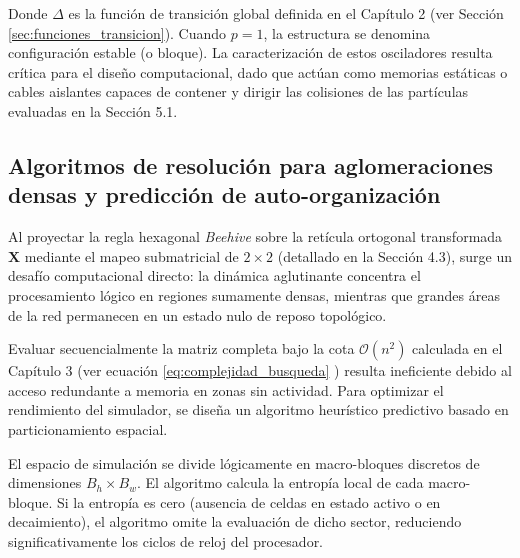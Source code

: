 Donde $\Delta$ es la función de transición global definida en el Capítulo 2 (ver Sección \ref{sec:funciones_transicion}). Cuando $p = 1$, la estructura se denomina configuración estable (o bloque). La caracterización de estos osciladores resulta crítica para el diseño computacional, dado que actúan como memorias estáticas o cables aislantes capaces de contener y dirigir las colisiones de las partículas evaluadas en la Sección 5.1.

\subsection{Algoritmos de resolución para aglomeraciones densas y predicción de auto-organización}
\label{subsec:algoritmo_beehive_particionado}

Al proyectar la regla hexagonal \textit{Beehive} sobre la retícula ortogonal transformada $\mathbf{X}$ mediante el mapeo submatricial de $2 \times 2$ (detallado en la Sección 4.3), surge un desafío computacional directo: la dinámica aglutinante concentra el procesamiento lógico en regiones sumamente densas, mientras que grandes áreas de la red permanecen en un estado nulo de reposo topológico. 

Evaluar secuencialmente la matriz completa bajo la cota $\mathcal{O}(n^2)$ calculada en el Capítulo 3 (ver ecuación \eqref{eq:complejidad_busqueda} %
) resulta ineficiente debido al acceso redundante a memoria en zonas sin actividad. Para optimizar el rendimiento del simulador, se diseña un algoritmo heurístico predictivo basado en particionamiento espacial. 

El espacio de simulación se divide lógicamente en macro-bloques discretos de dimensiones $B_h \times B_w$. El algoritmo calcula la entropía local de cada macro-bloque. Si la entropía es cero (ausencia de celdas en estado activo o en decaimiento), el algoritmo omite la evaluación de dicho sector, reduciendo significativamente los ciclos de reloj del procesador.

